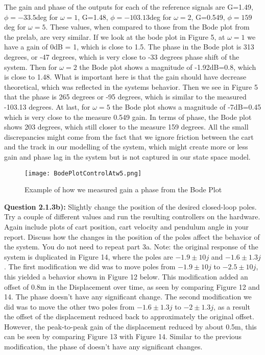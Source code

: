 \documentclass[11pt, twoside, letterpaper]{article}   	%
\begin{document}
The gain and phase of the outputs for each of the reference signals are G=1.49, $\phi=-33.5$deg for $\omega=1$, G=1.48, $\phi=-103.13$deg for $\omega=2$, G=0.549, $\phi=159$deg for $\omega=5$. These values, when compared to those from the Bode plot from the prelab, are very similar. If we look at the bode plot in Figure 5, at $\omega=1$ we have a gain of 0dB = 1, which is close to 1.5. The phase in the Bode plot is 313 degrees, or -47 degrees, which is very close to -33 degrees phase shift of the system. Then for $\omega=2$ the Bode plot shows a magnitude of -1.92dB=0.8, which is close to 1.48. What is important here is that the gain should have decrease theoretical, which was reflected in the systems behavior. Then we see in Figure 5 that the phase is 265 degrees or -95 degrees, which is similar to the measured -103.13 degrees. At last, for $\omega=5$ the Bode plot shows a magnitude of -7dB=0.45 which is very close to the measure 0.549 gain. In terms of phase, the Bode plot shows 203 degrees, which still closer to the measure 159 degrees. All the small discrepancies might come from the fact that we ignore friction between the cart and the track in our modelling of the system, which might create more or less gain and phase lag in the system but is not captured in our state space model.

\begin{figure}[htbp]
\begin{center}
\texttt{[image: BodePlotControlAtw5.png]}
\caption{Example of how we measured gain a phase from the Bode Plot}
\label{default}
\end{center}
\end{figure}
\FloatBarrier

\textbf{Question 2.1.3b):} Slightly change the position of the desired closed-loop poles. Try a couple of different values and run the resulting controllers on the hardware. Again include plots of cart position, cart velocity and pendulum angle in your report. Discuss how the changes in the position of the poles affect the behavior of the system. You do not need to repeat part 3a.
Note: the original response of the system is duplicated in Figure 14, where the poles are $-1.9\pm10j$ and $-1.6\pm1.3j$.
The first modification we did was to move poles from $-1.9\pm10j$ to $-2.5\pm10j$, this yielded a behavior shown in Figure 12 below. This modification
added an offset of 0.8m in the Displacement over time, as seen by comparing Figure 12 and 14. The phase doesn't have any significant change. 
The second modification we did was to move the other two poles from $-1.6\pm1.3j$ to $-2\pm1.3j$, as a result the offset of the displacement reduced 
back to approximately the original offset. However, the peak-to-peak gain of the displacement reduced by about 0.5m, this can be seen by comparing 
Figure 13 with Figure 14. Similar to the previous modification, the phase of doesn't have any significant changes.
\end{document}

